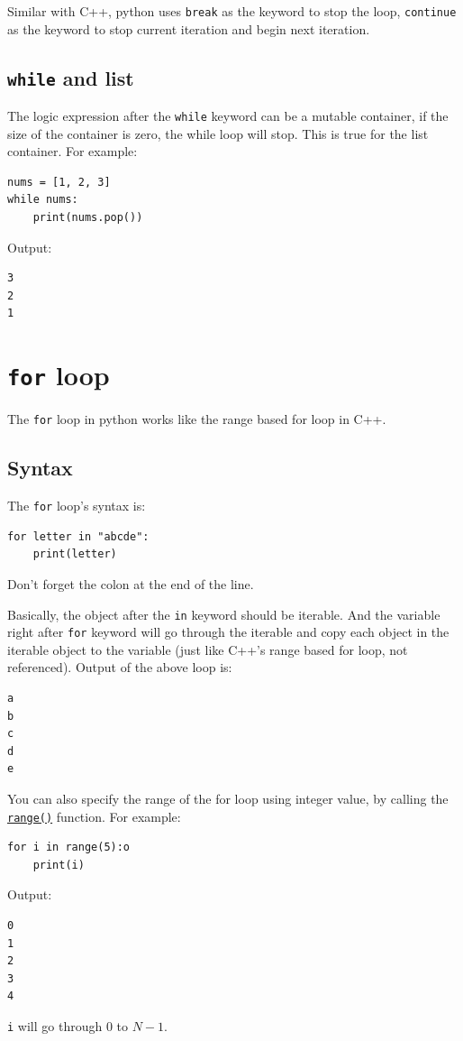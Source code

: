 \documentclass[12pt]{book}
\begin{document}
Similar with C++, python uses \texttt{break} as the keyword to stop the loop, \texttt{continue} as the keyword to stop current iteration and begin next iteration.
\subsection{\texttt{while} and list}
\label{sec:orged33e17}
The logic expression after the \texttt{while} keyword can be a mutable container, if the size of the container is zero, the while loop will stop. This is true for the list container. For example:
\begin{verbatim}
nums = [1, 2, 3]
while nums:
    print(nums.pop())   
\end{verbatim}
Output:
\begin{verbatim}
3
2
1
\end{verbatim}

\section{\texttt{for} loop}
\label{sec:org59773fa}
The \texttt{for} loop in python works like the range based for loop in C++. 
\subsection{Syntax}
\label{sec:org6a24d26}
The \texttt{for} loop's syntax is:
\begin{verbatim}
for letter in "abcde":
    print(letter)
\end{verbatim}
Don't forget the colon at the end of the line.

Basically, the object after the \texttt{in} keyword should be iterable. And the variable right after \texttt{for} keyword will go through the iterable and copy each object in the iterable object to the variable (just like C++'s range based for loop, not referenced). Output of the above loop is:
\begin{verbatim}
a
b
c
d
e
\end{verbatim}

You can also specify the range of the for loop using integer value, by calling the \href{https://docs.python.org/3/library/stdtypes.html\#range}{\texttt{range()}} function. For example:
\begin{verbatim}
for i in range(5):o
    print(i)
\end{verbatim}
Output:
\begin{verbatim}
0
1
2
3
4
\end{verbatim}
\texttt{i} will go through \(0\) to \(N - 1\).
\end{document}
